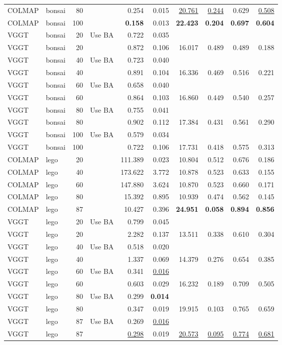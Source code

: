 \begin{table}[H]
\begin{tabular}{llrlrrrrrr}
COLMAP & bonsai & 80 &  & 0.254 & 0.015 & \underline{20.761} & \underline{0.244} & 0.629 & \underline{0.508} \\
COLMAP & bonsai & 100 &  & \textbf{0.158} & 0.013 & \textbf{22.423} & \textbf{0.204} & \textbf{0.697} & \textbf{0.604} \\
VGGT & bonsai & 20 & Use BA & 0.722 & 0.035 &  &  &  &  \\
VGGT & bonsai & 20 &  & 0.872 & 0.106 & 16.017 & 0.489 & 0.489 & 0.188 \\
VGGT & bonsai & 40 & Use BA & 0.723 & 0.040 &  &  &  &  \\
VGGT & bonsai & 40 &  & 0.891 & 0.104 & 16.336 & 0.469 & 0.516 & 0.221 \\
VGGT & bonsai & 60 & Use BA & 0.658 & 0.040 &  &  &  &  \\
VGGT & bonsai & 60 &  & 0.864 & 0.103 & 16.860 & 0.449 & 0.540 & 0.257 \\
VGGT & bonsai & 80 & Use BA & 0.755 & 0.041 &  &  &  &  \\
VGGT & bonsai & 80 &  & 0.902 & 0.112 & 17.384 & 0.431 & 0.561 & 0.290 \\
VGGT & bonsai & 100 & Use BA & 0.579 & 0.034 &  &  &  &  \\
VGGT & bonsai & 100 &  & 0.722 & 0.106 & 17.731 & 0.418 & 0.575 & 0.313 \\
\midrule
COLMAP & lego & 20 &  & 111.389 & 0.023 & 10.804 & 0.512 & 0.676 & 0.186 \\
COLMAP & lego & 40 &  & 173.622 & 3.772 & 10.878 & 0.523 & 0.633 & 0.155 \\
COLMAP & lego & 60 &  & 147.880 & 3.624 & 10.870 & 0.523 & 0.660 & 0.171 \\
COLMAP & lego & 80 &  & 15.392 & 0.895 & 10.939 & 0.474 & 0.562 & 0.145 \\
COLMAP & lego & 87 &  & 10.427 & 0.396 & \textbf{24.951} & \textbf{0.058} & \textbf{0.894} & \textbf{0.856} \\
VGGT & lego & 20 & Use BA & 0.799 & 0.045 &  &  &  &  \\
VGGT & lego & 20 &  & 2.282 & 0.137 & 13.511 & 0.338 & 0.610 & 0.304 \\
VGGT & lego & 40 & Use BA & 0.518 & 0.020 &  &  &  &  \\
VGGT & lego & 40 &  & 1.337 & 0.069 & 14.379 & 0.276 & 0.654 & 0.385 \\
VGGT & lego & 60 & Use BA & 0.341 & \underline{0.016} &  &  &  &  \\
VGGT & lego & 60 &  & 0.603 & 0.029 & 16.232 & 0.189 & 0.709 & 0.505 \\
VGGT & lego & 80 & Use BA & 0.299 & \textbf{0.014} &  &  &  &  \\
VGGT & lego & 80 &  & 0.347 & 0.019 & 19.915 & 0.103 & 0.765 & 0.659 \\
VGGT & lego & 87 & Use BA & 0.269 & \underline{0.016} &  &  &  &  \\
VGGT & lego & 87 &  & \underline{0.298} & 0.019 & \underline{20.573} & \underline{0.095} & \underline{0.774} & \underline{0.681} \\
\bottomrule
\end{tabular}
\end{table}